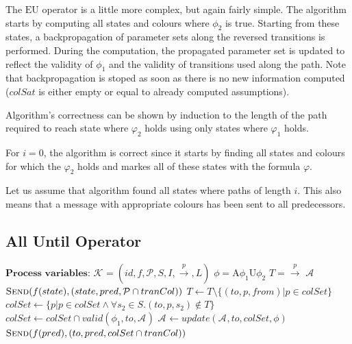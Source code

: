 \documentclass[12pt,oneside, draft]{fithesis2}
\newcommand{\as}[1][]{\ensuremath{\mathcal{A}_{#1}}}
\newcommand{\ks}[1][]{\ensuremath{\mathcal{K}_{#1}}}
\newcommand{\trans}[1]{\stackrel{#1}{\rightarrow}}
\newcommand{\eu}[2]{\ensuremath{\mbox{E} #1 \mbox{U} #2 }}
\newcommand{\au}[2]{\ensuremath{\mbox{A} #1 \mbox{U} #2 }}
\begin{document}
				The \eu{}{} operator is a little more complex, but again fairly simple. The algorithm starts by computing all states and colours where $\phi_2$ is true. Starting from these states, a backpropagation of parameter sets along the reversed transitions is performed. During the computation, the propagated parameter set is updated to reflect the validity of $\phi_1$ and the validity of transitions used along the path. Note that backpropagation is stoped as soon as there is no new information computed ($colSat$ is either empty or equal to already computed assumptions).
				
				Algorithm's correctness can be shown by induction to the length of the path required to reach state where $\varphi_2$ holds using only states where $\varphi_1$ holds.
				
				For $i=0$, the algorithm is correct since it starts by finding all states and colours for which the $\varphi_2$ holds and markes all of these states with the formula $\varphi$.
				
				Let us assume that algorithm found all states where paths of length $i$. This also means that a message with appropriate colours has been sent to all predecessors. 
			
		    \subsection{All Until Operator}
				\begin{algorithmic}[1]
				\State $ \textbf{Process variables:} $
				\State $ \ks = (id, f, \mathcal{P}, S, I, \trans{p}, L) $ 
				\State $ \phi = \au{\phi_1}{\phi_2}  $ 
				\State $ T = \trans{p} $ 
				\State $ \as $ 
							\State $ \Call{Send}{f(state), (state, pred, \mathcal{P} \cap tranCol)} $
						\EndFor
					\EndFor
				\EndProcedure
					\State $ T \gets T \setminus \{ (to, p, from) | p \in colSet \} $
					\State $ colSet \gets \{ p | p \in colSet \wedge \forall s_2 \in S. (to, p, s_2) \notin T \} $
					\State $ colSet \gets colSet \cap valid(\phi_1, to, \as)$
					\If{$ colSet \neq \emptyset $ \textbf{and} $ colSet \setminus valid(\phi, to, \as) \neq \emptyset $}
						\State $ \as \gets update(\as, to, colSet, \phi) $
							\State $ \Call{Send}{f(pred), (to, pred, colSet \cap tranCol)} $
						\EndFor
					\EndIf
				\EndProcedure
				\end{algorithmic}	
				
\end{document}
